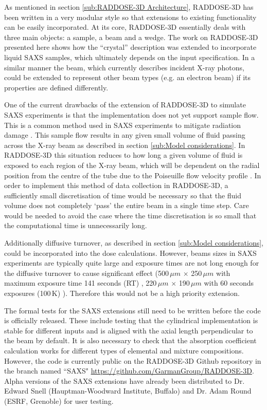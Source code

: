 As mentioned in section \ref{sub:RADDOSE-3D Architecture}, RADDOSE-3D has been written in a very modular style so that extensions to existing functionality can be easily incorporated.
At its core, RADDOSE-3D essentially deals with three main objects: a sample, a beam and a wedge.
The work on RADDOSE-3D presented here shows how the ``crystal'' description was extended to incorporate liquid SAXS samples, which ultimately depends on the input specification.
In a similar manner the beam, which currently describes incident X-ray photons, could be extended to represent other beam types (e.g. an electron beam) if its properties are defined differently.

One of the current drawbacks of the extension of RADDOSE-3D to simulate SAXS experiments is that the implementation does not yet support sample flow.
This is a common method used in SAXS experiments to mitigate radiation damage \cite{jeffries2015limiting}.
This sample flow results in any given small volume of fluid passing across the X-ray beam as described in section \ref{sub:Model considerations}.
In RADDOSE-3D this situation reduces to how long a given volume of fluid is exposed to each region of the X-ray beam, which will be dependent on the radial position from the centre of the tube due to the Poiseuille flow velocity profile \cite{hopkins2016quantifying}.
In order to implement this method of data collection in RADDOSE-3D, a sufficiently small discretisation of time would be necessary so that the fluid volume does not completely `pass' the entire beam in a single time step.
Care would be needed to avoid the case where the time discretisation is so small that the computational time is unnecessarily long.

Additionally diffusive turnover, as described in section \ref{sub:Model considerations}, could be incorporated into the dose calculations.
However, beams sizes in SAXS experiments are typically quite large and exposure times are not long enough for the diffusive turnover to cause significant effect (500$\,\mu m$ $\times$ 250$\,\mu m$ with maximum exposure time 141 seconds (RT) \cite{jeffries2015limiting}, 220$\,\mu m$ $\times$ 190$\,\mu m$ with 60 seconds exposures (100$\,$K) \cite{meisburger2013breaking}).
Therefore this would not be a high priority extension.

The formal tests for the SAXS extensions still need to be written before the code is officially released.
These include testing that the cylindrical implementation is stable for different inputs and is aligned with the axial length perpendicular to the beam by default.
It is also necessary to check that the absorption coefficient calculation works for different types of elemental and mixture compositions.
However, the code is currently public on the RADDOSE-3D Github repository in the branch named ``SAXS" \url{https://github.com/GarmanGroup/RADDOSE-3D}.
Alpha versions of the SAXS extensions have already been distributed to Dr. Edward Snell (Hauptman-Woodward Institute, Buffalo) and Dr. Adam Round (ESRF, Grenoble) for user testing.

